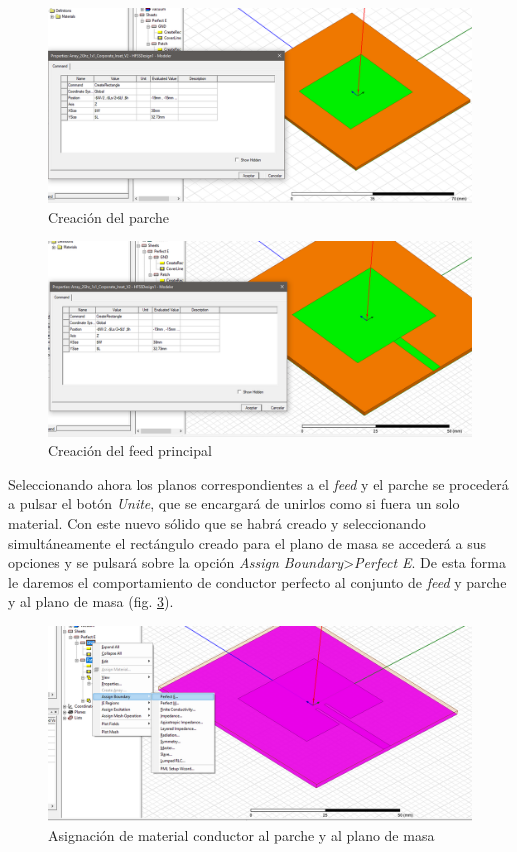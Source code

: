 \\ 
\begin{figure}[p]
    \centering
        \includegraphics[width=\textwidth]{archivos/desarrollo/3}
        \caption{Creación del parche}
        \label{fig:parche}
\end{figure}
\begin{figure}[p]
    \centering
        \includegraphics[width=\textwidth]{archivos/desarrollo/4}
        \caption{Creación del feed principal}
        \label{fig:feed}
\end{figure}
\par Seleccionando ahora los planos correspondientes a el \textit{feed} y el parche se procederá a pulsar el botón \textit{Unite}, que se encargará de unirlos como si fuera un solo material. Con este nuevo sólido que se habrá creado y seleccionando simultáneamente el rectángulo creado para el plano de masa se accederá a sus opciones y se pulsará sobre la opción \textit{Assign Boundary}>\textit{Perfect E}. De esta forma le daremos el comportamiento de conductor perfecto al conjunto de \textit{feed} y parche y al plano de masa (fig. \ref{fig:perfecte}). 
\\
\begin{figure}[h]
    \centering
        \includegraphics[width=\textwidth]{archivos/desarrollo/5}
        \caption{Asignación de material conductor al parche y al plano de masa}
        \label{fig:perfecte}
\end{figure}
